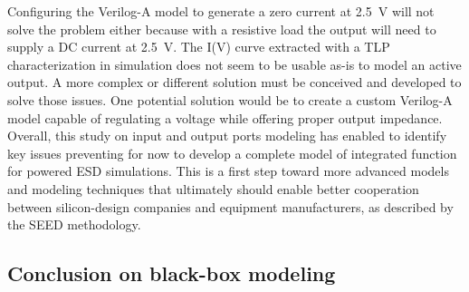 Configuring the Verilog-A model to generate a zero current at \SI{2.5}{\volt} will not solve the problem either because with a resistive load the output will need to supply a DC current at \SI{2.5}{\volt}.
The I(V) curve extracted with a TLP characterization in simulation does not seem to be usable as-is to model an active output.
A more complex or different solution must be conceived and developed to solve those issues.
One potential solution would be to create a custom Verilog-A model capable of regulating a voltage while offering proper output impedance.
Overall, this study on input and output ports modeling has enabled to identify key issues preventing for now to develop a complete model of integrated function for powered ESD simulations.
This is a first step toward more advanced models and modeling techniques that ultimately should enable better cooperation between silicon-design companies and equipment manufacturers, as described by the SEED methodology.

\subsection{Conclusion on black-box modeling}

